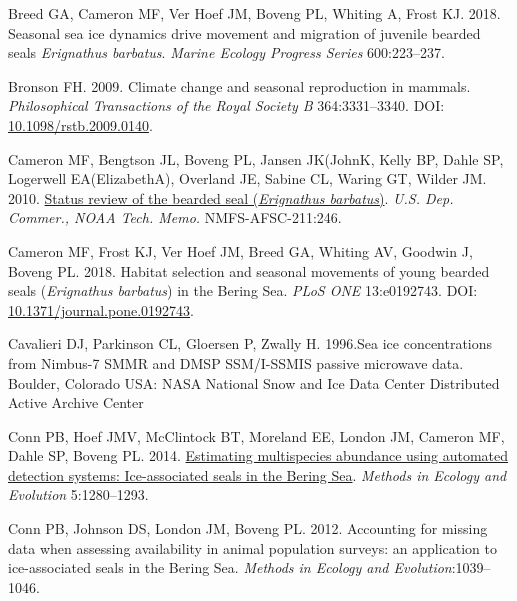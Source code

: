 \documentclass[fleqn,10pt,lineno]{wlpeerj} %
\newlength{\cslhangindent}
\newlength{\cslentryspacingunit} %
\newenvironment{CSLReferences}[2] %
 {%
  \setlength{\parindent}{0pt}
  \ifodd #1
  \let\oldpar\par
  \def\par{\hangindent=\cslhangindent\oldpar}
  \fi
  \setlength{\parskip}{#2\cslentryspacingunit}
 }%
 {}
\begin{document}
\begin{CSLReferences}{1}{0}
\leavevmode{}%
Breed GA, Cameron MF, Ver Hoef JM, Boveng PL, Whiting A, Frost KJ. 2018. Seasonal sea ice dynamics drive movement and migration of juvenile bearded seals \emph{Erignathus barbatus}. \emph{Marine Ecology Progress Series} 600:223--237.

\leavevmode{}%
Bronson FH. 2009. Climate change and seasonal reproduction in mammals. \emph{Philosophical Transactions of the Royal Society B} 364:3331--3340. DOI: \href{https://doi.org/10.1098/rstb.2009.0140}{10.1098/rstb.2009.0140}.

\leavevmode{}%
Cameron MF, Bengtson JL, Boveng PL, Jansen JK(JohnK, Kelly BP, Dahle SP, Logerwell EA(ElizabethA), Overland JE, Sabine CL, Waring GT, Wilder JM. 2010. \href{https://repository.library.noaa.gov/view/noaa/3761}{Status review of the bearded seal (\emph{Erignathus barbatus})}. \emph{U.S. Dep. Commer., NOAA Tech. Memo.} NMFS-AFSC-211:246.

\leavevmode{}%
Cameron MF, Frost KJ, Ver Hoef JM, Breed GA, Whiting AV, Goodwin J, Boveng PL. 2018. Habitat selection and seasonal movements of young bearded seals (\emph{Erignathus barbatus}) in the Bering Sea. \emph{PLoS ONE} 13:e0192743. DOI: \href{https://doi.org/10.1371/journal.pone.0192743}{10.1371/journal.pone.0192743}.

\leavevmode{}%
Cavalieri DJ, Parkinson CL, Gloersen P, Zwally H. 1996.Sea ice concentrations from Nimbus-7 SMMR and DMSP SSM/I-SSMIS passive microwave data. Boulder, Colorado USA: NASA National Snow and Ice Data Center Distributed Active Archive Center

\leavevmode{}%
Conn PB, Hoef JMV, McClintock BT, Moreland EE, London JM, Cameron MF, Dahle SP, Boveng PL. 2014. \href{https://onlinelibrary.wiley.com/doi/abs/10.1111/2041-210X.12127}{Estimating multispecies abundance using automated detection systems: Ice-associated seals in the Bering Sea}. \emph{Methods in Ecology and Evolution} 5:1280--1293.

\leavevmode{}%
Conn PB, Johnson DS, London JM, Boveng PL. 2012. Accounting for missing data when assessing availability in animal population surveys: an application to ice-associated seals in the Bering Sea. \emph{Methods in Ecology and Evolution}:1039--1046.


\end{CSLReferences}
\end{document}
